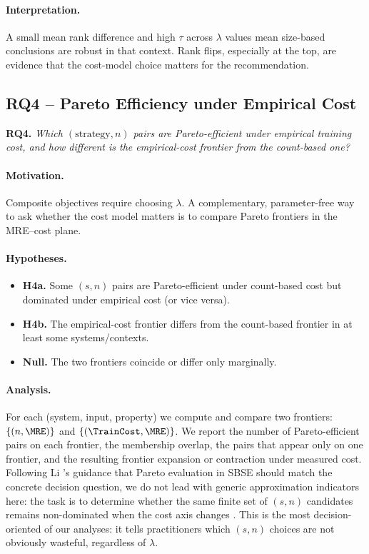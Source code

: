 \paragraph*{Interpretation.}
A small mean rank difference and high $\tau$ across $\lambda$ values mean
size-based conclusions are robust in that context. Rank flips, especially at
the top, are evidence that the cost-model choice matters for the
recommendation.

\subsection{RQ4 -- Pareto Efficiency under Empirical Cost}
\label{subsec:rq4}

\textbf{RQ4.} \emph{Which $(\text{strategy},n)$ pairs are Pareto-efficient under
empirical training cost, and how different is the empirical-cost frontier from
the count-based one?}

\paragraph*{Motivation.}
Composite objectives require choosing $\lambda$. A complementary,
parameter-free way to ask whether the cost model matters is to compare
Pareto frontiers in the MRE--cost plane.

\paragraph*{Hypotheses.}
\begin{itemize}
    \item \textbf{H4a.} Some $(s,n)$ pairs are Pareto-efficient under
    count-based cost but dominated under empirical cost (or vice versa).
    \item \textbf{H4b.} The empirical-cost frontier differs from the
    count-based frontier in at least some systems/contexts.
    \item \textbf{Null.} The two frontiers coincide or differ only marginally.
\end{itemize}

\paragraph*{Analysis.}
For each (system, input, property) we compute and compare two frontiers:
$\{(n,\MRE)\}$ and $\{(\TrainCost,\MRE)\}$. We report the number of
Pareto-efficient pairs on each frontier, the membership overlap, the pairs that
appear only on one frontier, and the resulting frontier expansion or
contraction under measured cost. Following Li \etal's guidance that Pareto
evaluation in SBSE should match the concrete decision question, we do not lead
with generic approximation indicators here: the task is to determine whether
the same finite set of $(s,n)$ candidates remains non-dominated when the cost
axis changes \cite{li2020pareto}. This is the most decision-oriented of our
analyses: it tells practitioners which $(s,n)$ choices are not obviously
wasteful, regardless of $\lambda$.

